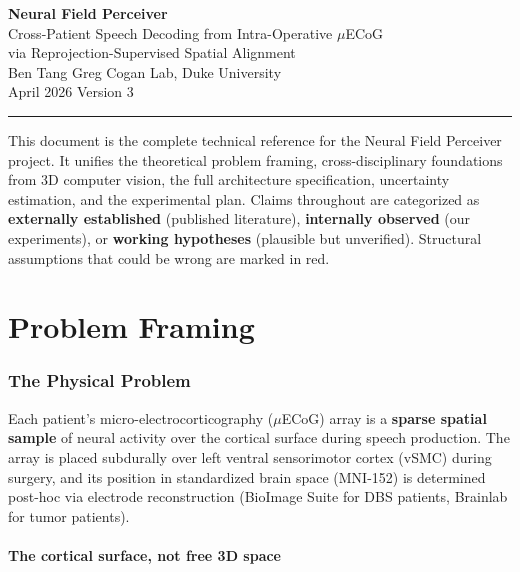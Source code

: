 \documentclass[11pt,letterpaper]{article}
\begin{document}
\begin{center}
{\LARGE\bfseries Neural Field Perceiver}\\[6pt]
{\large Cross-Patient Speech Decoding from Intra-Operative $\mu$ECoG\\via Reprojection-Supervised Spatial Alignment}\\[12pt]
{\normalsize Ben Tang \quad\textbar\quad Greg Cogan Lab, Duke University}\\[4pt]
{\normalsize April 2026 \quad\textbar\quad Version 3}
\end{center}

\medskip\noindent\rule{\textwidth}{0.4pt}\medskip

\noindent This document is the complete technical reference for the Neural Field Perceiver project. It unifies the theoretical problem framing, cross-disciplinary foundations from 3D computer vision, the full architecture specification, uncertainty estimation, and the experimental plan. Claims throughout are categorized as \textbf{externally established} (published literature), \textbf{internally observed} (our experiments), or \textbf{working hypotheses} (plausible but unverified). Structural assumptions that could be wrong are marked in \textcolor{BrickRed}{red}.

\tableofcontents
\newpage



\part{Problem Framing}

\section{The Physical Problem}

Each patient's micro-electrocorticography ($\mu$ECoG) array is a \textbf{sparse spatial sample} of neural activity over the cortical surface during speech production. The array is placed subdurally over left ventral sensorimotor cortex (vSMC) during surgery, and its position in standardized brain space (MNI-152) is determined post-hoc via electrode reconstruction (BioImage Suite for DBS patients, Brainlab for tumor patients).

\subsection{The cortical surface, not free 3D space}
\end{document}
